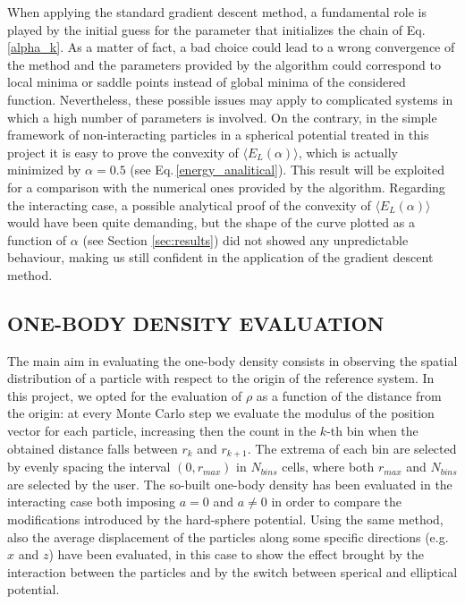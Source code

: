 When applying the standard gradient descent method, a fundamental role is played by the initial guess for the parameter that initializes the chain of Eq.\,\ref{alpha_k}. As a matter of fact, a bad choice could lead to a wrong convergence of the method and the parameters provided by the algorithm could correspond to local minima or saddle points instead of global minima of the considered function. Nevertheless, these possible issues may apply to complicated systems in which a high number of parameters is involved. On the contrary, in the simple framework of non-interacting particles in a spherical potential treated in this project it is easy to prove the convexity of $\langle E_L(\alpha) \rangle$, which is actually minimized by $\alpha=0.5$ (see Eq.\,\ref{energy_analitical}). This result will be exploited for a comparison with the numerical ones provided by the algorithm. Regarding the interacting case, a possible analytical proof of the convexity of $\langle E_L(\alpha) \rangle$ would have been quite demanding, but the shape of the curve plotted as a function of $\alpha$ (see Section \ref{sec:results}) did not showed any unpredictable behaviour, making us still confident in the application of the gradient descent method. 


\subsection{ONE-BODY DENSITY EVALUATION}
\label{sec:one_body_density}
The main aim in evaluating the one-body density consists in observing the spatial distribution of a particle with respect to the origin of the reference system. In this project, we opted for the evaluation of $\rho$ as a function of the distance from the origin: at every Monte Carlo step we evaluate the modulus of the position vector for each particle, increasing then the count in the $k$-th bin when the obtained distance falls between $r_k$ and $r_{k+1}$. The extrema of each bin are selected by evenly spacing the interval $(0, r_{max})$ in $N_{bins}$ cells, where both $r_{max}$ and $N_{bins}$ are selected by the user. The so-built one-body density has been evaluated in the interacting case both imposing $a=0$ and $a\neq0$ in order to compare the modifications introduced by the hard-sphere potential. Using the same method, also the average displacement of the particles along some specific directions (e.g. $x$ and $z$) have been evaluated, in this case to show the effect brought by the interaction between the particles and by the switch between sperical and elliptical potential.


